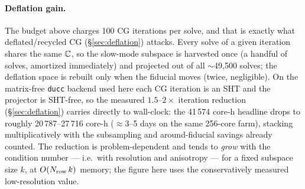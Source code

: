 \paragraph{Deflation gain.} The budget above charges 100 CG
iterations per solve, and that is exactly what deflated/recycled CG
(\S\ref{sec:deflation}) attacks.  Every solve of a given iteration shares
the same $\mathbb{C}$, so the slow-mode subspace is harvested once (a handful of
solves, amortized immediately) and projected out of all $\sim$49,500
solves; the deflation space is rebuilt only when the fiducial moves (twice,
negligible).  On the matrix-free \texttt{ducc} backend used here each CG
iteration is an SHT and the projector is SHT-free, so the measured
$1.5$--$2\times$ iteration reduction (\S\ref{sec:deflation}) carries
directly to wall-clock: the 41\,574 core-h headline drops to roughly
20\,787--27\,716
core-h ($\approx$3--5
days on the same 256-core farm), stacking multiplicatively with the
subsampling and around-fiducial savings already counted.  The reduction is
problem-dependent and tends to \emph{grow} with the condition number ---
i.e.\ with resolution and anisotropy --- for a fixed subspace size $k$, at
$O(N_{\rm row}\,k)$ memory; the figure here uses the conservatively
measured low-resolution value.
